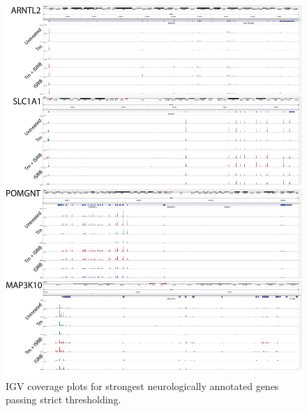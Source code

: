 \documentclass[11pt, a4paper, oneside]{article}
\begin{document}
\begin{figure}
\centering
  \includegraphics[width=180mm]{figures/xpresspipe_supplement3.png}
  \caption{IGV coverage plots for strongest neurologically annotated genes passing strict thresholding.}
  \label{fig:supplement3}
\end{figure}
\end{document}
